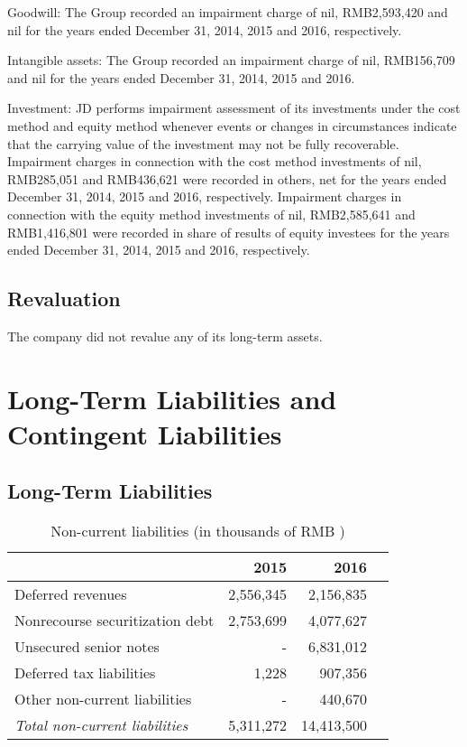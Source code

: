 Goodwill: The Group recorded an impairment charge of nil, RMB2,593,420 and nil for the years ended December 31, 2014, 2015 and 2016, respectively.

Intangible assets: The Group recorded an impairment charge of nil, RMB156,709 and nil for the years ended December 31, 2014, 2015 and 2016.

Investment: JD performs impairment assessment of its investments under the cost method and equity method whenever events or changes in circumstances indicate that the carrying value of the investment may not be fully recoverable. Impairment charges in connection with the cost method investments of nil, RMB285,051 and RMB436,621 were recorded in others, net for the years ended December 31, 2014, 2015 and 2016, respectively. Impairment charges in connection with the equity method investments of nil, RMB2,585,641 and RMB1,416,801 were recorded in share of results of equity investees for the years ended December 31, 2014, 2015 and 2016, respectively.

\subsection{Revaluation}
The company did not revalue any of its long-term assets.

\section{Long-Term Liabilities and Contingent Liabilities}

\subsection{Long-Term Liabilities}
\begin{table}[H]	
	\begin{center}
		\begin{tabular}{lrrr}
			\toprule
			&\textbf{2015}&\textbf{2016}\\
			\midrule
			Deferred revenues& 	2,556,345&	2,156,835\\
			Nonrecourse securitization debt  &	2,753,699&	4,077,627\\
			Unsecured senior notes  &	-&	6,831,012\\
			Deferred tax liabilities &	1,228&	907,356\\
			Other non-current liabilities &	-&	440,670\\
			\qquad\emph{Total non-current liabilities}&	5,311,272&	14,413,500\\
			\bottomrule
		\end{tabular}
	\end{center}
	\caption{Non-current liabilities (in thousands of RMB \textyen)}\label{table:1}
\end{table}

